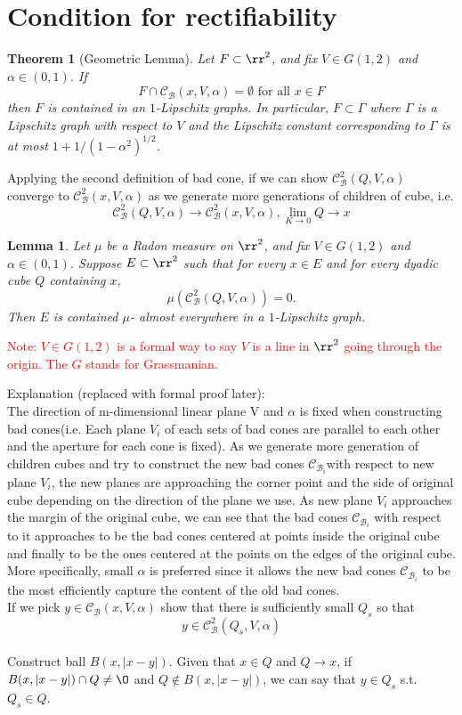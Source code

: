\documentclass{article}
\newtheorem{lemma}{Lemma}
\newtheorem{theorem}{Theorem}
\begin{document}
\section{Condition for rectifiability}

\begin{theorem}[Geometric Lemma] Let $F\subset \rr^2$, and fix $V\in G(1,2)$ and $\alpha\in(0,1)$.  If 
	\[F\cap \mathcal{C}_\mathcal{B}(x,V, \alpha)=\emptyset\text{ for all }x\in F\]
	then $F$ is contained in an $1$-Lipschitz graphs.  In particular, $F\subset\Gamma$ where $\Gamma$ is a Lipschitz graph with respect to $V$ and the Lipschitz constant corresponding to $\Gamma$ is at most $1+1/(1-\alpha^2)^{1/2}$.
	\label{thm:geometric_lemma}
\end{theorem}

Applying the second definition of bad cone, if we can show $\mathcal{C}^2_\mathcal{B}(Q,V,\alpha)$ converge to $\mathcal{C}^2_\mathcal{B}(x,V,\alpha)$ as we generate more generations of children of cube, i.e.\[\mathcal{C}^2_\mathcal{B}(Q,V,\alpha)\to \mathcal{C}^2_\mathcal{B}(x,V,\alpha),\lim_{K\to 0}Q \to x\]


\begin{lemma}
Let $\mu$ be a Radon measure on $\rr^2$, and fix $V\in G(1,2)$ and $\alpha\in(0,1)$.  Suppose $E\subset\rr^2$ such that for every $x\in E$ and for every dyadic cube $Q$ containing $x$, \[\mu(\mathcal{C}_\mathcal{B}^2(Q,V,\alpha))=0.\] Then $E$ is contained $\mu$- almost everywhere in a $1$-Lipschitz graph.
\end{lemma}

\textcolor{red}{Note: $V\in G(1,2)$ is a formal way to say $V$ is a line in $\rr^2$ going through the origin.  The $G$ stands for Grassmanian.}

Explanation (replaced with formal proof later): \\ The direction of m-dimensional linear plane V and $\alpha$ is fixed when constructing bad cones(i.e. Each plane $V_i$ of each sets of bad cones are parallel to each other and the aperture for each cone is fixed). As we generate more generation of children cubes and try to construct the new bad cones $\mathcal{C}_{\mathcal{B}_i}$with respect to new plane $V_i$, the new planes are approaching the corner point and the side of original cube depending on the direction of the plane we use. As new plane $V_i$ approaches the margin of the original cube, we can see that the bad cones $\mathcal{C}_{\mathcal{B}_i}$ with respect to it approaches to be the bad cones centered at points inside the original cube and finally to be the ones centered at the points on the edges of the original cube. More specifically, small $\alpha$ is preferred since it allows the new bad cones $\mathcal{C}_{\mathcal{B}_i}$ to be the most efficiently capture the content of the old bad cones.\\
If we pick $y \in \mathcal{C}_\mathcal{B}(x,V,\alpha)$ show that there is sufficiently small $Q_s$ so that \[y\in \mathcal{C}^2_\mathcal{B}(Q_s,V,\alpha)\]\\
Construct ball $B(x,|x-y|)$. Given that $x\in Q$ and $Q \to x$, if $B(x,|x-y|) \cap Q \neq \O$ and $Q \notin B(x,|x-y|)$, we can say that $y \in Q_s$ s.t.$Q_s \in Q$.\\
\end{document}
